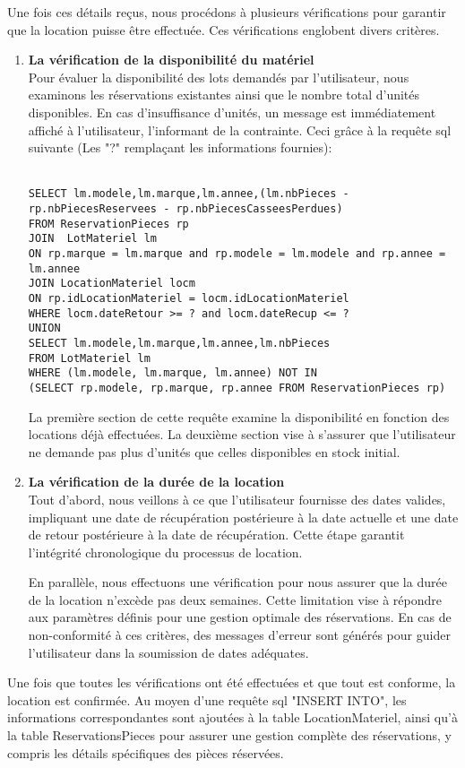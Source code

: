 Une fois ces détails reçus, nous procédons à plusieurs vérifications pour garantir que la location puisse être effectuée. Ces vérifications englobent divers critères.

\begin{enumerate}
    \item \textbf{La vérification de la disponibilité du matériel}\\
    Pour évaluer la disponibilité des lots demandés par l'utilisateur, nous examinons les réservations existantes ainsi que le nombre total d'unités disponibles. En cas d'insuffisance d'unités, un message est immédiatement affiché à l'utilisateur, l'informant de la contrainte.
    Ceci grâce à la requête sql suivante (Les "?" remplaçant les informations fournies): \\
    \\
    \begin{lstlisting}[style=SQL, label=sql-e]
SELECT lm.modele,lm.marque,lm.annee,(lm.nbPieces - rp.nbPiecesReservees - rp.nbPiecesCasseesPerdues)
FROM ReservationPieces rp
JOIN  LotMateriel lm 
ON rp.marque = lm.marque and rp.modele = lm.modele and rp.annee = lm.annee
JOIN LocationMateriel locm
ON rp.idLocationMateriel = locm.idLocationMateriel
WHERE locm.dateRetour >= ? and locm.dateRecup <= ?
UNION
SELECT lm.modele,lm.marque,lm.annee,lm.nbPieces
FROM LotMateriel lm 
WHERE (lm.modele, lm.marque, lm.annee) NOT IN
(SELECT rp.modele, rp.marque, rp.annee FROM ReservationPieces rp)
    \end{lstlisting}
    La première section de cette requête examine la disponibilité en fonction des locations déjà effectuées. La deuxième section vise à s'assurer que l'utilisateur ne demande pas plus d'unités que celles disponibles en stock initial.
    \item \textbf{La vérification de la durée de la location}\\
    Tout d'abord, nous veillons à ce que l'utilisateur fournisse des dates valides, impliquant une date de récupération postérieure à la date actuelle et une date de retour postérieure à la date de récupération. Cette étape garantit l'intégrité chronologique du processus de location.
    
    En parallèle, nous effectuons une vérification pour nous assurer que la durée de la location n'excède pas deux semaines. Cette limitation vise à répondre aux paramètres définis pour une gestion optimale des réservations. En cas de non-conformité à ces critères, des messages d'erreur sont générés pour guider l'utilisateur dans la soumission de dates adéquates.
\end{enumerate}
Une fois que toutes les vérifications ont été effectuées et que tout est conforme, la location est confirmée. Au moyen d'une requête sql "INSERT INTO", les informations correspondantes sont ajoutées à la table LocationMateriel, ainsi qu'à la table ReservationsPieces pour assurer une gestion complète des réservations, y compris les détails spécifiques des pièces réservées.

